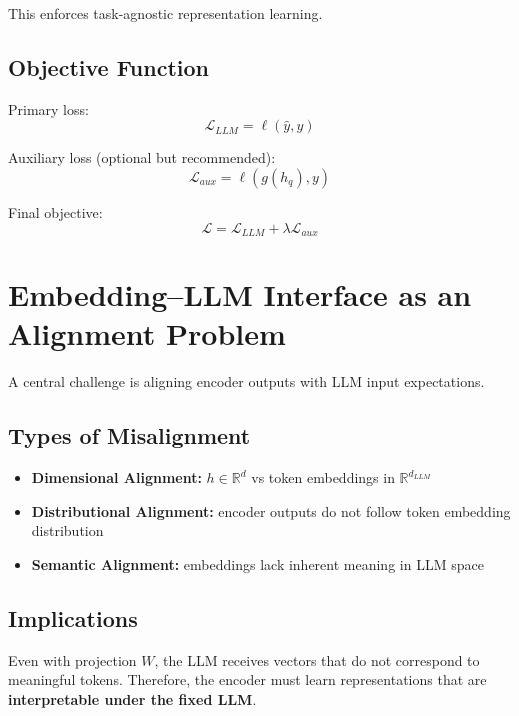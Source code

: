 \documentclass[11pt]{article}
\begin{document}
This enforces task-agnostic representation learning.

\subsection{Objective Function}

Primary loss:
\begin{equation}
\mathcal{L}_{LLM} = \ell(\hat{y}, y)
\end{equation}

Auxiliary loss (optional but recommended):
\begin{equation}
\mathcal{L}_{aux} = \ell(g(h_q), y)
\end{equation}

Final objective:
\begin{equation}
\mathcal{L} = \mathcal{L}_{LLM} + \lambda \mathcal{L}_{aux}
\end{equation}

\section{Embedding--LLM Interface as an Alignment Problem}

A central challenge is aligning encoder outputs with LLM input expectations.

\subsection{Types of Misalignment}

\begin{itemize}
\item \textbf{Dimensional Alignment:} $h \in \mathbb{R}^d$ vs token embeddings in $\mathbb{R}^{d_{LLM}}$
\item \textbf{Distributional Alignment:} encoder outputs do not follow token embedding distribution
\item \textbf{Semantic Alignment:} embeddings lack inherent meaning in LLM space
\end{itemize}

\subsection{Implications}

Even with projection $W$, the LLM receives vectors that do not correspond to meaningful tokens. Therefore, the encoder must learn representations that are \textbf{interpretable under the fixed LLM}.
\end{document}

